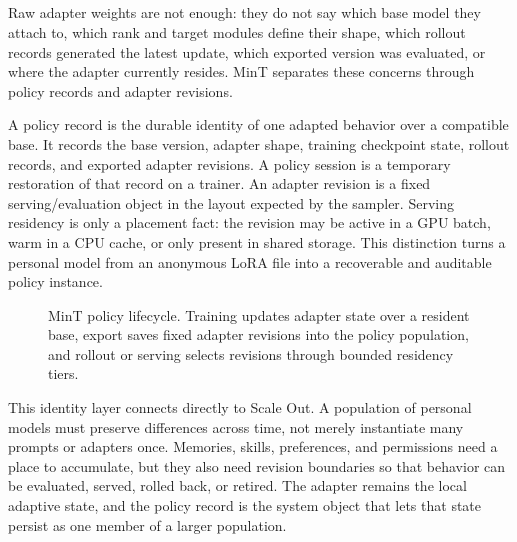 \subsection{}\label{subsec:infra-policy-identity}

 Raw adapter weights are not enough: they do not say which base model they attach to, which rank and target modules define their shape, which rollout records generated the latest update, which exported version was evaluated, or where the adapter currently resides. MinT separates these concerns through policy records and adapter revisions.



A policy record is the durable identity of one adapted behavior over a compatible base. It records the base version, adapter shape, training checkpoint state, rollout records, and exported adapter revisions. A policy session is a temporary restoration of that record on a trainer. An adapter revision is a fixed serving/evaluation object in the layout expected by the sampler. Serving residency is only a placement fact: the revision may be active in a GPU batch, warm in a CPU cache, or only present in shared storage. This distinction turns a personal model from an anonymous LoRA file into a recoverable and auditable policy instance.

\begin{figure}[t]
\centering
\resizebox{0.72\textwidth}{!}{}
\caption{MinT policy lifecycle. Training updates adapter state over a resident base, export saves fixed adapter revisions into the policy population, and rollout or serving selects revisions through bounded residency tiers.}
\label{fig:mint-policy-lifecycle}
\end{figure}

This identity layer connects directly to Scale Out. A population of personal models must preserve differences across time, not merely instantiate many prompts or adapters once. Memories, skills, preferences, and permissions need a place to accumulate, but they also need revision boundaries so that behavior can be evaluated, served, rolled back, or retired. The adapter remains the local adaptive state, and the policy record is the system object that lets that state persist as one member of a larger population.

